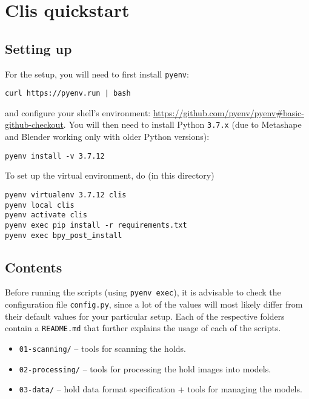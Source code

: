 \chapter{Clis quickstart}\label{apx:clis}

\section{Setting up}\label{apx:clissetup}

For the setup, you will need to first install \texttt{pyenv}:

\begin{verbatim}
curl https://pyenv.run | bash
\end{verbatim}

and configure your shell's environment: \url{https://github.com/pyenv/pyenv\#basic-github-checkout}.
You will then need to install Python \texttt{3.7.x} (due to Metashape and Blender working only with older Python versions):

\begin{verbatim}
pyenv install -v 3.7.12
\end{verbatim}

To set up the virtual environment, do (in this directory)

\begin{verbatim}
pyenv virtualenv 3.7.12 clis
pyenv local clis
pyenv activate clis
pyenv exec pip install -r requirements.txt
pyenv exec bpy_post_install
\end{verbatim}

\section{Contents}

Before running the scripts (using \texttt{pyenv exec}), it is advisable
to check the configuration file \texttt{config.py}, since a lot of the values will most likely
differ from their default values for your particular setup. Each of the
respective folders contain a \texttt{README.md} that further explains
the usage of each of the scripts.

\begin{itemize}
	\item \texttt{01-scanning/} -- tools for scanning the holds.
	\item \texttt{02-processing/} -- tools for processing the hold images into models.
	\item \texttt{03-data/} -- hold data format specification + tools for managing the models.
\end{itemize}

